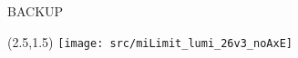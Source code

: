 \appendix
{}
\setcounter{finalframe}{\value{framenumber}}
\begin{frame}
 \huge BACKUP
\end{frame}


\begin{frame}
        \begin{textblock}{11}(2.5,1.5) %
            \texttt{[image: src/miLimit\_lumi\_26v3\_noAxE]}
        \end{textblock}

\end{frame}


\setcounter{framenumber}{\value{finalframe}}
